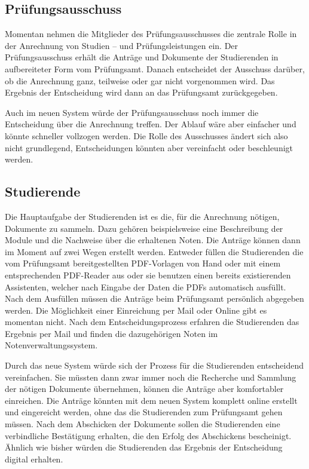 \documentclass[ngerman]{tudscrreprt}
\begin{document}
\subsection{Prüfungsausschuss}

Momentan nehmen die Mitglieder des Prüfungsausschusses die zentrale Rolle in der Anrechnung von Studien – und Prüfungsleistungen ein. Der Prüfungsausschuss erhält die Anträge und Dokumente der Studierenden in aufbereiteter Form vom Prüfungsamt. Danach entscheidet der Ausschuss darüber, ob die Anrechnung ganz, teilweise oder gar nicht vorgenommen wird. Das Ergebnis der Entscheidung wird dann an das Prüfungsamt zurückgegeben.

Auch im neuen System würde der Prüfungsausschuss noch immer die Entscheidung über die Anrechnung treffen. Der Ablauf wäre aber einfacher und könnte schneller vollzogen werden. Die Rolle des Ausschusses ändert sich also nicht grundlegend, Entscheidungen könnten aber vereinfacht oder beschleunigt werden.

\subsection{Studierende}

Die Hauptaufgabe der Studierenden ist es die, für die Anrechnung nötigen, Dokumente zu sammeln. Dazu gehören beispielsweise eine Beschreibung der Module und die Nachweise über die erhaltenen Noten. Die Anträge können dann im Moment auf zwei Wegen erstellt werden. Entweder füllen die Studierenden die vom Prüfungsamt bereitgestellten PDF-Vorlagen von Hand oder mit einem entsprechenden PDF-Reader aus oder sie benutzen einen bereits existierenden Assistenten, welcher nach Eingabe der Daten die PDFs automatisch ausfüllt. Nach dem Ausfüllen müssen die Anträge beim Prüfungsamt persönlich abgegeben werden. Die Möglichkeit einer Einreichung per Mail oder Online gibt es momentan nicht. Nach dem Entscheidungsprozess erfahren die Studierenden das Ergebnis per Mail und finden die dazugehörigen Noten im Notenverwaltungssystem.

Durch das neue System würde sich der Prozess für die Studierenden entscheidend vereinfachen. Sie müssten dann zwar immer noch die Recherche und Sammlung der nötigen Dokumente übernehmen, können die Anträge aber komfortabler einreichen. Die Anträge könnten mit dem neuen System komplett online erstellt und eingereicht werden, ohne das die Studierenden zum Prüfungsamt gehen müssen. Nach dem Abschicken der Dokumente sollen die Studierenden eine verbindliche Bestätigung erhalten, die den Erfolg des Abschickens bescheinigt. Ähnlich wie bisher würden die Studierenden das Ergebnis der Entscheidung digital erhalten.
\end{document}
